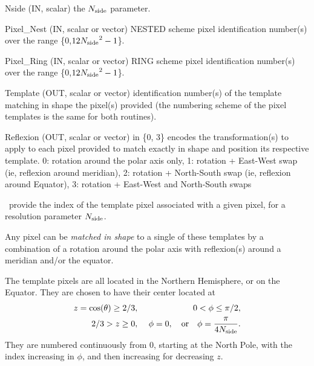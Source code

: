 \begin{qualifiers}
  \begin{qulist}{} %

\item[{Nside}] (IN, scalar) the \healpix ${N_{\rm side}}$ parameter. 
\item[{Pixel\_Nest}] (IN, scalar or vector) NESTED scheme pixel identification number(s) over the range \{0,$12{N_{\rm side}}^2-1$\}.
\item[{Pixel\_Ring}] (IN, scalar or vector) RING scheme pixel identification number(s) over the
                   range \{0,$12{N_{\rm side}}^2-1$\}.
\item[{Template}] (OUT, scalar or vector) identification number(s) of the
                   template matching in shape the pixel(s) provided (the numbering
                   scheme of the pixel templates is the same for both routines). 
\item[{Reflexion}] (OUT, scalar or vector) in \{0, 3\} encodes the transformation(s) to
                   apply to each pixel provided to match exactly in
                   shape and position its respective template. 0: rotation around the polar axis only,
                   1: rotation + East-West swap (ie, reflexion around meridian),
                   2: rotation + North-South swap (ie, reflexion around
                   Equator), 3: rotation + East-West and North-South swaps
  \end{qulist}
\end{qualifiers}

\begin{codedescription}
{\thedocid\ provide the index of the template pixel associated with a given
  \healpix pixel, for a resolution parameter ${N_{\rm side}}$. 

Any pixel can be {\em matched in shape}
  to a single of these templates by a combination of  a rotation around the polar axis with 
  reflexion(s) around a meridian and/or the equator. 

The template pixels are all located in the Northern Hemisphere, or on the
 Equator.
They are chosen to have their center located at
\begin{eqnarray}
     z=\cos(\theta)\ge 2/3,  &\ &    0< \phi \leq \pi/2,   \nonumber\\            %
     2/3 > z \geq 0,  &\ & \phi=0, \quad{\rm or}\quad  \phi=\frac{\pi}{4\nside}.  \nonumber %
\myhtmlimage{}
\end{eqnarray}
 They are numbered continuously from 0, starting at the North Pole, with the index
 increasing in $\phi$, and then increasing for decreasing $z$.
}
\end{codedescription}


